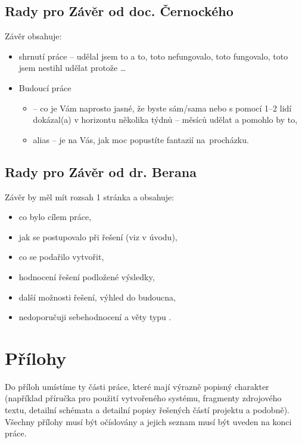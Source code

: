 \subsection*{Rady pro Závěr od doc. Černockého}

Závěr obsahuje:
 \begin{itemize}
   \item{shrnutí práce -- udělal jsem to a to, toto nefungovalo, toto fungovalo, toto jsem nestihl udělat protože \ldots}
   \item{Budoucí práce
     \begin{itemize}
       \item{ -- co je Vám naprosto jasné, že byste sám/sama nebo s pomocí 1--2 lidí dokázal(a) v horizontu několika týdnů -- měsíců udělat a pomohlo by to,}
       \item{ alias  -- je na Vás, jak moc popustíte fantazií na~procházku.}
     \end{itemize}}
\end{itemize}


\subsection*{Rady pro Závěr od dr. Berana}
Závěr by měl mít rozsah 1 stránka a obsahuje:
    \begin{itemize}
      \item{co bylo cílem práce,}
      \item{jak se postupovalo při řešení (viz  v úvodu),}
      \item{co se podařilo vytvořit,}
      \item{hodnocení řešení podložené výsledky,}
      \item{další možnosti řešení, výhled do budoucna,}
      \item{nedoporučuji sebehodnocení a věty typu .}
    \end{itemize}

\section{Přílohy}

Do příloh umístíme ty části práce, které mají výrazně popisný charakter (například příručka pro použití vytvořeného systému, fragmenty zdrojového textu, detailní schémata a detailní popisy řešených částí projektu a podobně). Všechny přílohy musí být očíslovány a jejich seznam musí být uveden na konci práce. \cite{fitWeb}

